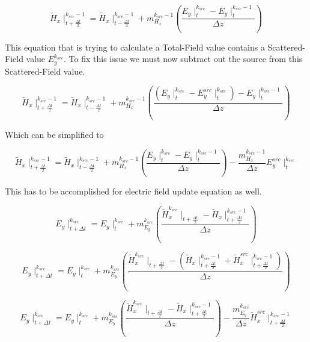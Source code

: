 \documentclass[a4paper,10pt]{article}
\begin{document}
\begin{equation*}
  \tilde{H}_{x}\mid_{t+\frac{\Delta t}{2}}^{k_{src}-1} = \tilde{H}_{x}\mid_{t-\frac{\Delta t}{2}}^{k_{src}-1} + m_{H_x}^{k_{src}-1}\left(\frac{E_{y}\mid_{t}^{k_{src}} - E_{y}\mid_{t}^{k_{src}-1}}{\Delta z}\right)
\end{equation*}

This equation that is trying to calculate a Total-Field value contains a Scattered-Field value $E_{y}^{k_{src}}$.  To fix this issue we must now subtract out the source from this Scattered-Field value.

\begin{equation*}
  \tilde{H}_{x}\mid_{t+\frac{\Delta t}{2}}^{k_{src}-1} = \tilde{H}_{x}\mid_{t-\frac{\Delta t}{2}}^{k_{src}-1} + m_{H_x}^{k_{src}-1}\left(\frac{\left( E_{y}\mid_{t}^{k_{src}} - E_{y}^{src}\mid_{t}^{k_{src}} \right) - E_{y}\mid_{t}^{k_{src}-1}}{\Delta z}\right)
\end{equation*}

Which can be simplified to

\begin{equation}
  \tilde{H}_{x}\mid_{t+\frac{\Delta t}{2}}^{k_{src}-1} = \tilde{H}_{x}\mid_{t-\frac{\Delta t}{2}}^{k_{src}-1} + m_{H_x}^{k_{src}-1}\left(\frac{E_{y}\mid_{t}^{k_{src}} - E_{y}\mid_{t}^{k_{src}-1}}{\Delta z}\right) - \frac{m_{H_x}^{k_{src}-1}}{\Delta z}  E_{y}^{src}\mid_{t}^{k_{src}} 
\end{equation}

This has to be accomplished for electric field update equation as well.

\begin{equation}
  E_{y}\mid_{t+\Delta t}^{k_{src}} = E_{y}\mid_{t}^{k_{src}} + m_{E_y}^{k_{src}}\left(\frac{\tilde{H}_{x}^{k_{src}}\mid_{t+\frac{\Delta t}{2}} - \tilde{H}_{x}\mid^{k_{src}-1}_{t+\frac  {\Delta t}{2}}}{\Delta z}\right)
\end{equation}

\begin{equation}
  E_{y}\mid_{t+\Delta t}^{k_{src}} = E_{y}\mid_{t}^{k_{src}} + m_{E_y}^{k_{src}}\left(\frac{\tilde{H}_{x}^{k_{src}}\mid_{t+\frac{\Delta t}{2}} - \left(\tilde{H}_{x}\mid^{k_{src}-1}_{t+\frac{\Delta t}{2}} +  \tilde{H}_{x}^{src}\mid^{k_{src}-1}_{t+\frac  {\Delta t}{2}}\right)}{\Delta z}\right)
\end{equation}

\begin{equation}
  E_{y}\mid_{t+\Delta t}^{k_{src}} = E_{y}\mid_{t}^{k_{src}} + m_{E_y}^{k_{src}}\left(\frac{\tilde{H}_{x}^{k_{src}}\mid_{t+\frac{\Delta t}{2}} - \tilde{H}_{x}\mid^{k_{src}-1}_{t+\frac  {\Delta t}{2}}}{\Delta z}\right)- \frac{m_{E_y}^{k_{src}}}{\Delta z}\tilde{H}_{x}^{src}\mid^{k_{src}-1}_{t+\frac{\Delta t}{2}}
\end{equation}
\end{document}
